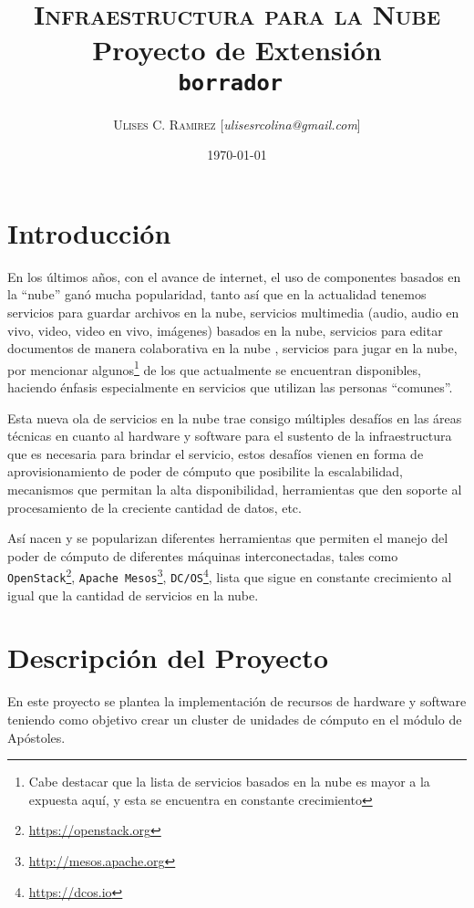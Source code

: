 \documentclass{article}
\title{\textsc{Infraestructura para la Nube}\\Proyecto de Extensión\\{\tt borrador }}
\author{\textsc{Ulises C. Ramirez} [\textit{ulisesrcolina@gmail.com}]}
\date{\today}
\begin{document}
\maketitle
\tableofcontents

\section{Introducción}%
\label{sec:introduccion}
En los últimos años, con el avance de internet, el uso de componentes basados
en la ``nube'' ganó
mucha popularidad, tanto así que en la actualidad tenemos servicios para
guardar archivos en la nube\cite{m-19, m-20, m-21},
servicios multimedia (audio\cite{m-1, m-2, m-3, m-4},
audio en vivo\cite{m-22},
video\cite{m-5, m-6, m-7},
video en vivo\cite{m-8},
imágenes\cite{m-9, m-10, m-11}) basados en la nube,
servicios para editar documentos de manera colaborativa en la nube
\cite{m-12, m-13, m-14, m-15},
servicios para jugar en la nube\cite{m-16, m-17, m-18}, por mencionar
algunos\footnote{Cabe destacar que la lista de servicios basados en la nube es
mayor a la expuesta aquí, y esta se encuentra en constante crecimiento}
de los que actualmente se encuentran disponibles, haciendo énfasis especialmente
en servicios que utilizan las personas ``comunes''.

Esta nueva ola de servicios
en la nube trae consigo múltiples desafíos en las áreas técnicas en cuanto al
hardware y software para el sustento de la infraestructura que es necesaria
para brindar el servicio, estos desafíos vienen en forma de aprovisionamiento
de poder de cómputo que posibilite la escalabilidad, mecanismos que permitan la
alta disponibilidad, herramientas que den soporte al procesamiento de la
creciente cantidad de datos, etc.

Así nacen y se popularizan diferentes herramientas que permiten el manejo del
poder de cómputo de diferentes máquinas interconectadas, tales como
\texttt{OpenStack}\footnote{\url{https://openstack.org}}, \texttt{Apache
Mesos}\footnote{ \url{http://mesos.apache.org}  },
\texttt{DC/OS}\footnote{ \url{https://dcos.io}  }, lista que sigue en constante
crecimiento al igual que la cantidad de servicios en la nube.

\section{Descripción del Proyecto}%
\label{sec:descripcion_del_proyecto}
En este proyecto se plantea la implementación de recursos de hardware y
software teniendo como objetivo crear un cluster de unidades de cómputo en el
módulo de Apóstoles.
\end{document}
